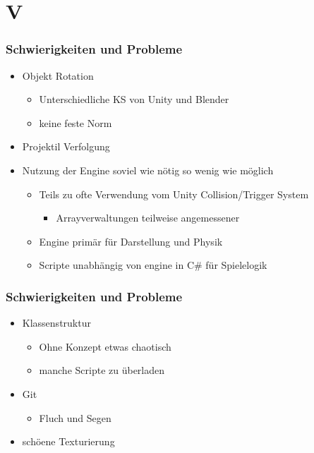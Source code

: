 ﻿\documentclass{beamer}
\begin{document}
\section{V}
\begin{frame} %
  \frametitle{Schwierigkeiten und Probleme} %
  
	\begin{itemize}
			\item Objekt Rotation
			
				\begin{itemize}
					\item Unterschiedliche KS von Unity und Blender
					\item keine feste Norm
				\end{itemize}
			
			\item Projektil Verfolgung
			
			\item Nutzung der Engine soviel wie nötig so wenig wie möglich
			
				\begin{itemize}
					\item Teils zu ofte Verwendung vom Unity Collision/Trigger System
					
						\begin{itemize}
							\item Arrayverwaltungen teilweise angemessener
						\end{itemize}
				
					\item Engine primär für Darstellung und Physik
					\item Scripte unabhängig von engine in C\# für Spielelogik 
				\end{itemize}
		\end{itemize}
	
\end{frame}

\begin{frame} %
  \frametitle{Schwierigkeiten und Probleme} %
  
	\begin{itemize}
			\item Klassenstruktur
			
				\begin{itemize}
					\item Ohne Konzept etwas chaotisch
					\item manche Scripte zu überladen
				\end{itemize}
				
			\item Git
				\begin{itemize}
					\item Fluch und Segen		
				\end{itemize}
				
			\item schöene Texturierung
		\end{itemize}
	
\end{frame}
\end{document}
